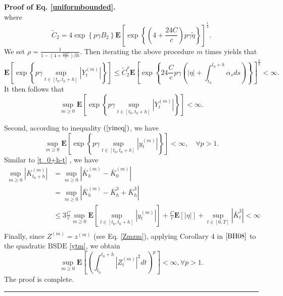 \documentclass[10pt]{article}%
\numberwithin{equation}{section}
\newenvironment{proof}[1][Proof]{\noindent \textbf{#1.} }{\  \rule{0.5em}{0.5em}}
\begin{document}
\begin{proof}[Proof of Eq. \eqref{uniformbounded}]
$$$$
where $$\widetilde{C}_2=4 \exp\left\{p \gamma B_2\right\} \mathbf{E}\left[\exp\left\{\left(4+\frac{24C}{c}\right)p\gamma\widetilde{\eta}\right\}\right]^{\frac{1}{2}}.$$
We set $\rho=\frac{1}{1-\left(4+\frac{24C}{c}\right)\beta h}$.  Then iterating the above procedure $m$ times yields that
$$\mathbf{E}\left[\exp \left\{p \gamma \sup _{t\in[t_0,t_0+h]}\left|Y_t^{(m)}\right|\right\}\right]\leq
\widetilde{C}_2^{\rho} \mathbf{E}\left[\exp\left\{24\frac{C}{c}p\gamma\left(\left|\eta\right|+\int_{t_0}^{t_0+h}\alpha_s ds\right)\right\}\right]^{\frac{\rho}{2}}<\infty.$$
It then follows that $$\sup_{m\geq 0}\mathbf{E}\left [ \exp\left \{ p\gamma\sup_{t\in[t_0,t_0+h]}\left | Y_t^{(m)} \right |  \right \}   \right ] <\infty.$$

Second, according to  inequality $(\ref{yineq})$, we have
$$\sup _{m \geq 0} \mathbf{E}\left[\exp \left\{p \gamma \sup _{t\in[t_0,t_0+h]}|y_t^{(m)}|\right\}\right]<\infty, \quad \forall p > 1.$$
Similar to \eqref{t_0+h-t} ,  we have %
$$
\begin{aligned}
\sup _{m \geq 0} \left|K_{t_0+h}^{(m)}\right| 
&=\sup _{m \geq 0} \left|\bar{K}_{h}^{(m)}-\bar{K}_{0}^{(m)}\right|\\
&=\sup _{m \geq 0} \left|\bar{K}_{h}^{(m)}-\bar{K}_{h}^{3}+\bar{K}_{h}^{3}\right|\\
&\leq 3\frac{C}{c}\sup_{m \geq 0}\mathbf{E}[\sup _{t\in[t_0,t_0+h]}|y_t^{(m)}|]+\frac{C}{c}\mathbf{E}\left[\left|\eta\right|\right]+\sup_{t\in[0,T]}\left|\bar{K}^3_t\right|<\infty \\
\end{aligned}
$$
Finally, since $Z^{(m)}=z^{(m)}$ (see Eq. \eqref{Zmzm}), applying  Corollary 4 in $\cite{BH08}$ to the quadratic $\text{BSDE}$ \eqref{ytm}, we obtain 
$$
\sup _{m \geq 0} \mathbf{E}\left[\left(\int_{t_0}^{t_0+h}\left|Z_t^{(m)}\right|^2 d t\right)^p\right]<\infty, \forall p > 1.
$$  
The proof is complete.
\end{proof}
\end{document}
